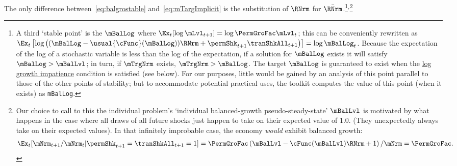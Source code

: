 \documentclass[BufferStockTheory]{subfiles}
\begin{document}
The only difference between~\eqref{eq:balgrostable} and~\eqref{eq:mTargImplicit} is the substitution of $\RNrm$ for $\bar{\RNrm}$.\footnote{A third `stable point' is the $\mBalLog$ where $\Ex_{t}[\log \mLvl_{t+1}] = \log \PermGroFac \mLvl_{t}$; this can be conveniently rewritten as $\Ex_{t}\left[\log\left((\mBalLog-\usual{\cFunc}(\mBalLog))\RNrm+\permShk_{t+1}\tranShkAll_{t+1}\right)\right]  = \log \mBalLog_{t}$.  Because the expectation of the log of a stochastic variable is less than the log of the expectation, if a solution for $\mBalLog$ exists it will satisfy $\mBalLog > \mBalLvl$; in turn, if $\mTrgNrm$ exists, $\mTrgNrm>\mBalLog$.  The target $\mBalLog$ is guaranteed to exist when the \hyperlink{GICSdl}{log growth impatience} condition is satisfied (see below).  For our purposes, little would be gained by an analysis of this point parallel to those of the other points of stability; but to accommodate potential practical uses,  the {\ARKurl} toolkit computes the value of this point (when it exists) as \texttt{mBalLog}.}$^{,}$\footnote{Our choice to call to this the individual problem's `individual balanced-growth pseudo-steady-state' $\mBalLvl$ is motivated by what happens in the case where all draws of all future shocks just happen to take on their expected value of 1.0.  (They unexpectedly always take on their expected values). In that infinitely improbable case, the economy \textit{would} exhibit balanced growth:
  \begin{align*}
    \Ex_{t}[\mNrm_{t+1}/\mNrm_{t}|\permShk_{t+1}=\tranShkAll_{t+1}=1] = \PermGroFac \left(\mBalLvl-\cFunc(\mBalLvl)\RNrm + 1 \right)/\mNrm = \PermGroFac.
  \end{align*}}
\end{document}
